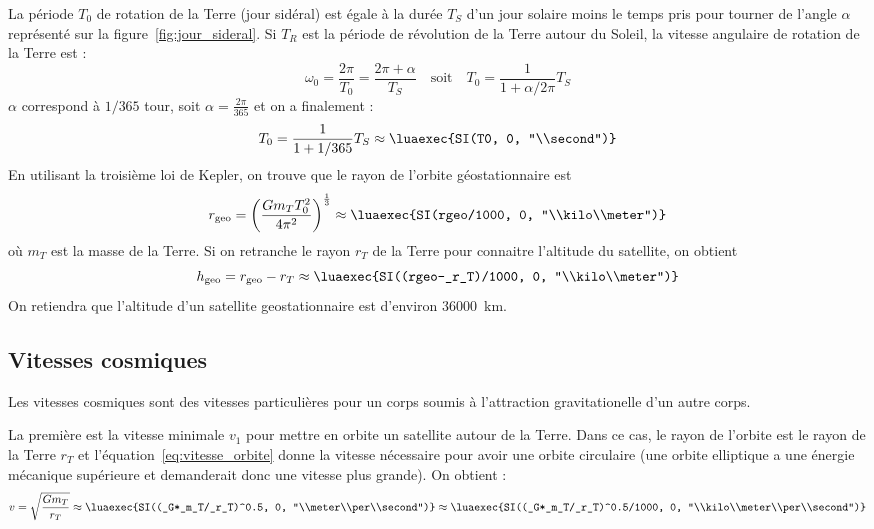 \documentclass{cours}
\begin{document}
La période $T_0$ de rotation de la Terre (jour sidéral) est égale à la durée $T_S$ d'un jour solaire moins le temps pris pour tourner de l'angle $\alpha$ représenté sur la figure~\ref{fig:jour_sideral}. Si $T_R$ est la période de révolution de la Terre autour du Soleil, la vitesse angulaire de rotation de la Terre est :
\begin{equation}
  \omega_0 = \frac{2\pi}{T_0} = \frac{2\pi + \alpha}{T_S} \quad \text{soit} \quad T_0 = \frac{1}{1+\alpha/2\pi}T_S
\end{equation}
$\alpha$ correspond à $1/365$ tour, soit $\alpha=\frac{2\pi}{365}$ et on a finalement :
\begin{equation}
  T_0 = \frac{1}{1+1/365}T_S \approx \luaexec{SI(T0, 0, "\\second")}
\end{equation}
En utilisant la troisième loi de Kepler, on trouve que le rayon de l'orbite géostationnaire est 
\begin{equation}
  r_\text{geo}=\left( \frac{G m_T T_0^2}{4\pi^2} \right)^{\frac{1}{3}} \approx \luaexec{SI(rgeo/1000, 0, "\\kilo\\meter")} 
\end{equation}
où $m_T$ est la masse de la Terre. Si on retranche le rayon $r_T$  de la Terre pour connaitre l'altitude du satellite, on obtient 
\begin{equation}
  h_\text{geo} = r_\text{geo}-r_T \approx \luaexec{SI((rgeo-_r_T)/1000, 0, "\\kilo\\meter")}
\end{equation}
%
On retiendra que l'altitude d'un satellite geostationnaire est d'environ \SI{36000}{\kilo\meter}.

\subsection{Vitesses cosmiques}%
\label{sub:vitesses_cosmiques}
Les vitesses cosmiques sont des vitesses particulières pour un corps soumis à l'attraction gravitationelle d'un autre corps. 

La première est la vitesse minimale $v_1$ pour mettre en orbite un satellite autour de la Terre. Dans ce cas, le rayon de l'orbite est le rayon de la Terre $r_T$ et l'équation~\eqref{eq:vitesse_orbite} donne la vitesse nécessaire pour avoir une orbite circulaire (une orbite elliptique a une énergie mécanique supérieure et demanderait donc une vitesse plus grande). On obtient :
\begin{equation}
  v=\sqrt{\frac{Gm_T}{r_T}}\approx \luaexec{SI((_G*_m_T/_r_T)^0.5, 0, "\\meter\\per\\second")}\approx \luaexec{SI((_G*_m_T/_r_T)^0.5/1000, 0, "\\kilo\\meter\\per\\second")}
\end{equation}
 
\end{document}
